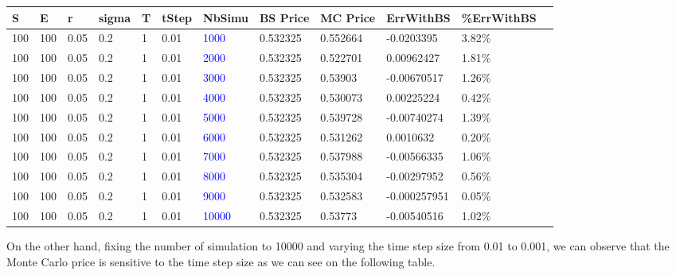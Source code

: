 \documentclass[11pt,oneside,a4paper, titlepage]{article}
\begin{document}
{
\centering
\begin{tabular}{|l|l|l|l|l|l|l|l|l|l|l|l|}
\hline
\small{\textbf{S}} &  \small{\textbf{E}} & \small{\textbf{r}} & \small{\textbf{sigma}} & \small{\textbf{T}}	&  \small{\textbf{tStep}} & \small{\textbf{NbSimu}} & \small{\textbf{BS Price}} & \small{\textbf{MC Price}} & \small{\textbf{ErrWithBS}} & \small{\textbf{\%ErrWithBS}}\\
\hline
100 & 100 & 0.05 & 0.2 & 1 & 0.01 & \textcolor{blue}{1000} & 0.532325 & 0.552664 & -0.0203395 & 3.82\%\\
\hline
100 & 100 & 0.05 & 0.2 & 1 & 0.01 & \textcolor{blue}{2000} & 0.532325 & 0.522701 & 0.00962427 & 1.81\%\\
\hline
100 & 100 & 0.05 & 0.2 & 1 & 0.01 & \textcolor{blue}{3000} & 0.532325 & 0.53903 & -0.00670517 & 1.26\%\\
\hline
100 & 100 & 0.05 & 0.2 & 1 & 0.01 & \textcolor{blue}{4000} & 0.532325 & 0.530073 & 0.00225224 & 0.42\%\\
\hline
100 & 100 & 0.05 & 0.2 & 1 & 0.01 & \textcolor{blue}{5000} & 0.532325 & 0.539728 & -0.00740274 & 1.39\%\\
\hline
100 & 100 & 0.05 & 0.2 & 1 & 0.01 & \textcolor{blue}{6000} & 0.532325 & 0.531262 & 0.0010632 & 0.20\%\\
\hline
100 & 100 & 0.05 & 0.2 & 1 & 0.01 & \textcolor{blue}{7000} & 0.532325 & 0.537988 & -0.00566335 & 1.06\%\\
\hline
100 & 100 & 0.05 & 0.2 & 1 & 0.01 & \textcolor{blue}{8000} & 0.532325 & 0.535304 & -0.00297952 & 0.56\%\\
\hline
100 & 100 & 0.05 & 0.2 & 1 & 0.01 & \textcolor{blue}{9000} & 0.532325 & 0.532583 & -0.000257951 & 0.05\%\\
\hline
100 & 100 & 0.05 & 0.2 & 1 & 0.01 & \textcolor{blue}{10000} & 0.532325 & 0.53773 & -0.00540516 & 1.02\%\\
\hline
\end{tabular}
}

\vskip 0.2cm 
On the other hand, fixing the number of simulation to 10000 and varying the time step size from 0.01 to 0.001, we can observe that the Monte Carlo price is sensitive to the time step size as we can see on the following table.
\vskip 0.2cm
\end{document}
